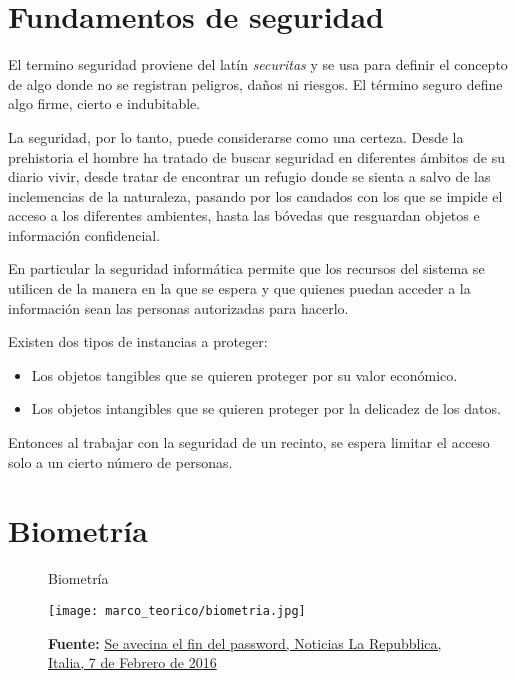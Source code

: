 \documentclass[../principal]{subfiles}
\begin{document}
  \section{Fundamentos de seguridad}

  El termino seguridad proviene del latín \textsl{securitas} y se usa para definir el concepto de algo donde no se registran peligros, daños ni riesgos. El término seguro define algo firme, cierto e indubitable.\cite{web:seguridad}

  La seguridad, por lo tanto, puede considerarse como una certeza. Desde la prehistoria el hombre ha tratado de buscar seguridad en diferentes ámbitos de su diario vivir, desde tratar de encontrar un refugio donde se sienta a salvo de las inclemencias de la naturaleza, pasando por los candados con los que se impide el acceso a los diferentes ambientes, hasta las bóvedas que resguardan objetos e información confidencial.

  En particular la seguridad informática permite que los recursos del sistema se utilicen de la manera en la que se espera y que quienes puedan acceder a la información sean las personas autorizadas para hacerlo.\cite{web:definicion_seguridad}

  Existen dos tipos de instancias a proteger:
  \begin{itemize}
    \setlength\itemsep{0.1em}
	  \item Los objetos tangibles que se quieren proteger por su valor económico.
	  \item Los objetos intangibles que se quieren proteger por la delicadez de los datos.
  \end{itemize}

  Entonces al trabajar con la seguridad de un recinto, se espera limitar el acceso solo a un cierto número de personas.

  \section{Biometría}

  \begin{wrapfigure}[10]{R}[0pt]{0.4\textwidth}
    \centering
	  \caption{Biometría}
	  \texttt{[image: marco\_teorico/biometria.jpg]}
	  \caption*{\textbf{Fuente:} \href{http://www.dagospia.com/mediagallery/Dago_fotogallery-154538/761377.htm}{Se avecina el fin del password, Noticias La Repubblica, Italia, 7 de Febrero de 2016}}
  \end{wrapfigure}
\end{document}
